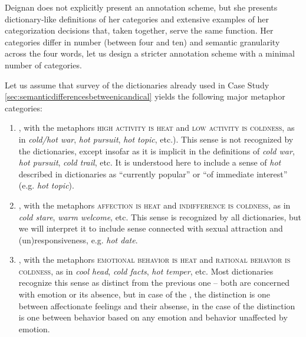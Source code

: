 Deignan does not explicitly present an annotation  scheme, but she presents dictionary\hyp{}like  definitions of her categories and extensive examples of her categorization  decisions that, taken together, serve the same function. Her categories differ in number (between four and ten) and semantic  granularity across the four words, let us design  a stricter annotation  scheme with a minimal number of  categories.

Let us assume that survey of the dictionaries  already used in Case Study \ref{sec:semanticdifferencesbetweenicandical} yields the following major metaphor categories:

\begin{enumerate}

\item {}, with the metaphors \textsc{high activity is heat} and \textsc{low activity is coldness}, as in \textit{cold\slash hot war}, \textit{hot pursuit}, \textit{hot topic}, etc.). This sense is not recognized by the dictionaries,  except insofar as it is implicit in the definitions of \textit{cold war}, \textit{hot pursuit}, \textit{cold trail}, etc. It is understood here to include a sense of \textit{hot} described in dictionaries as ``currently popular'' or ``of immediate interest'' (e.g. \textit{hot topic}).

\item {}, with the metaphors  \textsc{affection is heat} and \textsc{indifference is coldness}, as in \textit{cold stare}, \textit{warm welcome}, etc. This sense is recognized by all dictionaries,  but we will interpret it to include sense connected with sexual attraction and (un)responsiveness, e.g. \textit{hot date}.

\item {}, with the metaphors  \textsc{emotional behavior is heat} and \textsc{rational behavior is coldness}, as in \textit{cool head}, \textit{cold facts}, \textit{hot temper}, etc. Most dictionaries  recognize this sense as distinct from the previous one -- both are concerned with emotion  or its absence, but in case of the , the distinction is one between affectionate feelings and their absense, in the case of  the distinction is one between behavior based on any emotion  and behavior unaffected by emotion.


\end{enumerate}
